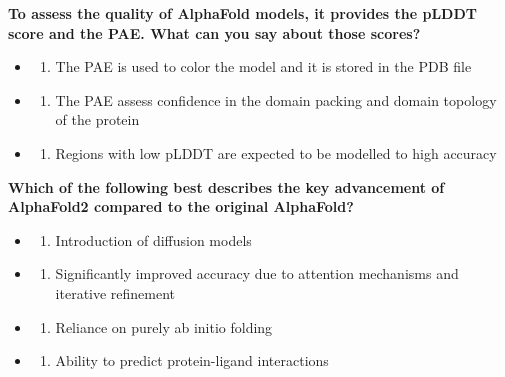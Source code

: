 \documentclass[
]{scrbook}
\providecommand{\tightlist}{%
  \setlength{\itemsep}{0pt}\setlength{\parskip}{0pt}}\usepackage{longtable,booktabs,array}
\begin{document}
\textbf{To assess the quality of AlphaFold models, it provides the pLDDT
score and the PAE. What can you say about those scores? }

\begin{itemize}
\tightlist
\item
  \begin{enumerate}
  \def\labelenumi{(\Alph{enumi})}
  \tightlist
  \item
    The PAE is used to color the model and it is stored in the PDB
    file\\
  \end{enumerate}
\item
  \begin{enumerate}
  \def\labelenumi{(\Alph{enumi})}
  \setcounter{enumi}{1}
  \tightlist
  \item
    The PAE assess confidence in the domain packing and domain topology
    of the protein\\
  \end{enumerate}
\item
  \begin{enumerate}
  \def\labelenumi{(\Alph{enumi})}
  \setcounter{enumi}{2}
  \tightlist
  \item
    Regions with low pLDDT are expected to be modelled to high accuracy
  \end{enumerate}
\end{itemize}

\textbf{Which of the following best describes the key advancement of
AlphaFold2 compared to the original AlphaFold? }

\begin{itemize}
\tightlist
\item
  \begin{enumerate}
  \def\labelenumi{(\Alph{enumi})}
  \tightlist
  \item
    Introduction of diffusion models\\
  \end{enumerate}
\item
  \begin{enumerate}
  \def\labelenumi{(\Alph{enumi})}
  \setcounter{enumi}{1}
  \tightlist
  \item
    Significantly improved accuracy due to attention mechanisms and
    iterative refinement\\
  \end{enumerate}
\item
  \begin{enumerate}
  \def\labelenumi{(\Alph{enumi})}
  \setcounter{enumi}{2}
  \tightlist
  \item
    Reliance on purely ab initio folding\\
  \end{enumerate}
\item
  \begin{enumerate}
  \def\labelenumi{(\Alph{enumi})}
  \setcounter{enumi}{3}
  \tightlist
  \item
    Ability to predict protein-ligand interactions
  \end{enumerate}
\end{itemize}
\end{document}
